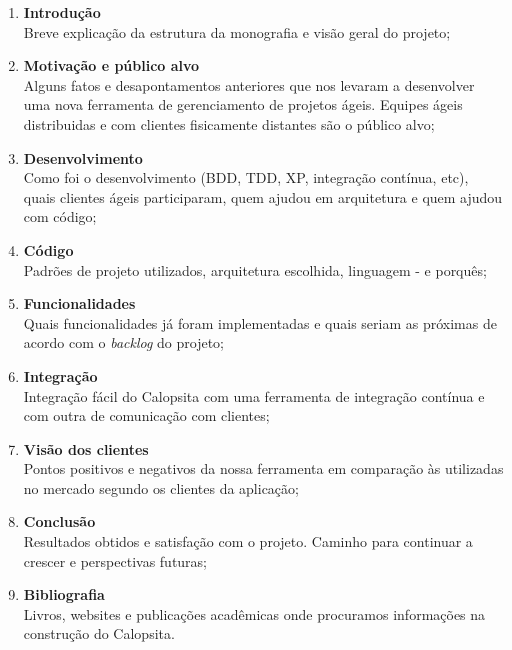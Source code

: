 \documentclass[titlepage]{article}
\begin{document}
\begin{enumerate}
	\item{\textbf{Introdução} \\ Breve explicação da estrutura da monografia e visão geral do projeto;}
	\item{\textbf{Motivação e público alvo} \\ Alguns fatos e desapontamentos anteriores que nos levaram a desenvolver uma nova ferramenta de gerenciamento de projetos ágeis. Equipes ágeis distribuidas e com clientes fisicamente distantes são o público alvo;}
	\item{\textbf{Desenvolvimento} \\ Como foi o desenvolvimento (BDD, TDD, XP, integração contínua, etc), quais clientes ágeis participaram, quem ajudou em arquitetura e quem ajudou com código;}
	\item{\textbf{Código} \\ Padrões de projeto utilizados, arquitetura escolhida, linguagem - e porquês;}
	\item{\textbf{Funcionalidades} \\ Quais funcionalidades já foram implementadas e quais seriam as próximas de acordo com o \textit{backlog} do projeto;}
	\item{\textbf{Integração} \\ Integração fácil do Calopsita com uma ferramenta de integração contínua e com outra de comunicação com clientes;}
	\item{\textbf{Visão dos clientes} \\ Pontos positivos e negativos da nossa ferramenta em comparação às utilizadas no mercado segundo os clientes da aplicação;}
	\item{\textbf{Conclusão} \\ Resultados obtidos e satisfação com o projeto. Caminho para continuar a crescer e perspectivas futuras;}
	\item{\textbf{Bibliografia} \\ Livros, websites e publicações acadêmicas onde procuramos informações na construção do Calopsita.}
\end{enumerate}
\end{document}
